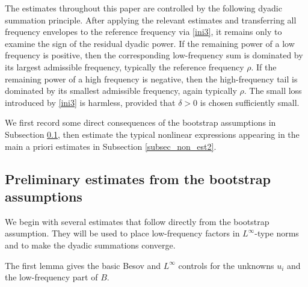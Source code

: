 \documentclass[11pt,letterpaper,reqno]{amsart}
\numberwithin{equation}{section}
\theoremstyle{definition}
\theoremstyle{remark}
\begin{document}
 The estimates throughout this paper are controlled by the following dyadic summation principle. After applying the relevant estimates and transferring all frequency envelopes to the reference frequency via \eqref{ini3}, it remains only to examine the sign of the residual dyadic power. If the remaining power of a low frequency is positive, then the corresponding low-frequency sum is dominated by its largest admissible frequency, typically the reference frequency \(\rho\). If the remaining power of a high frequency is negative, then the high-frequency tail is dominated by its smallest admissible frequency, again typically \(\rho\). The small loss introduced by \eqref{ini3} is harmless, provided that \(\delta>0\) is chosen sufficiently small.
 

We first record some direct consequences of the bootstrap assumptions in
Subsection \ref{subsec_non_est1}, then estimate the typical nonlinear
expressions appearing in the main a priori estimates in Subsection
\ref{subsec_non_est2}.

\subsection{Preliminary estimates from the bootstrap assumptions}
\label{subsec_non_est1}

We begin with several estimates that follow directly from the bootstrap
assumption.  They will be used to place low-frequency factors in $L^\infty$-type
norms and to make the dyadic summations converge.

 

The first lemma gives the basic Besov and $L^\infty$ controls for the
unknowns $u_i$ and the low-frequency part of $B$.
\end{document}
